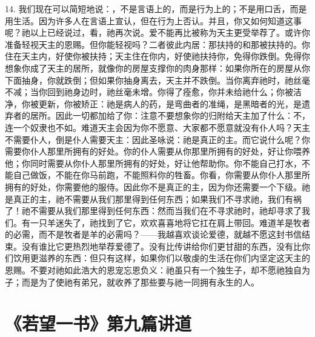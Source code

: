 14. 我们现在可以简短地说：，不是言语上的，而是行为上的；不是用口舌，而是用生活。因为许多人在言语上宣认，但在行为上否认。并且，你又如何知道这事呢？祂以上已经说过，看，祂再次说。爱不能再比被称为天主更受举荐了。或许你准备轻视天主的恩赐。但你能轻视吗？二者彼此内居：那扶持的和那被扶持的。你住在天主内，好使你被扶持；天主住在你内，好使祂扶持你，免得你跌倒。免得你想象你成了天主的居所，就像你的房屋支撑你的肉身那样：如果你所在的房屋从你下面抽身，你就跌倒；但如果你抽身离去，天主并不跌倒。当你离弃祂时，祂丝毫不减；当你回到祂身边时，祂丝毫未增。你得了痊愈，你并未给祂什么；你被洁净，你被更新，你被矫正：祂是病人的药，是弯曲者的准绳，是黑暗者的光，是遗弃者的居所。因此一切都加给了你：注意不要想象你的归附给天主加了什么：不，连一个奴隶也不如。难道天主会因为你不愿意、大家都不愿意就没有仆人吗？天主不需要仆人，倒是仆人需要天主：因此圣咏说：祂是真正的主。而它说什么呢？你需要你仆人那里所拥有的好处。你的仆人需要从你那里所拥有的好处，好让你喂养他；你同时需要从你仆人那里所拥有的好处，好让他帮助你。你不能自己打水，不能自己做饭，不能在你马前跑，不能照料你的牲畜。你看，你需要从你仆人那里所拥有的好处，你需要他的服侍。因此你不是真正的主，因为你还需要一个下级。祂是真正的主，祂不需要从我们那里得到任何东西；如果我们不寻求祂，我们有祸了！祂不需要从我们那里得到任何东西：然而当我们在不寻求祂时，祂却寻求了我们。有一只羊迷失了，祂找到了它，欢欢喜喜地将它扛在肩上带回。难道羊是牧者的必需，而不是牧者是羊的必需吗？——我越喜欢谈论爱德，就越不愿这封书信结束。没有谁比它更热烈地举荐爱德了。没有比传讲给你们更甘甜的东西，没有比你们饮用更滋养的东西：但只有这样，如果你们以敬虔的生活在你们内坚定这天主的恩赐。不要对祂如此浩大的恩宠忘恩负义：祂虽只有一个独生子，却不愿祂独自为子；而是为了使祂有弟兄，就收养了那些要与祂一同拥有永生的人。\par



\section{《若望一书》第九篇讲道}

